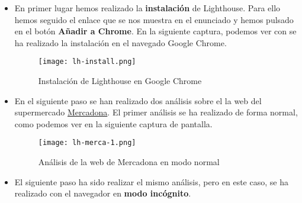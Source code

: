 \begin{itemize}
    \item En primer lugar hemos realizado la \textbf{instalación} de Lighthouse. Para ello hemos seguido el enlace que se nos muestra en el enunciado y hemos pulsado en el botón \textbf{Añadir a Chrome}. En la siguiente captura, podemos ver con se ha realizado la instalación en el navegado Google Chrome.

    \begin{figure}[H]
        \centering
        \texttt{[image: lh-install.png]}
        \caption{Instalación de Lighthouse en Google Chrome}
    \end{figure}

    \item En el siguiente paso se han realizado dos análisis sobre el la web del supermercado \href{https://www.mercadona.es/}{Mercadona}. El primer análisis se ha realizado de forma normal, como podemos ver en la siguiente captura de pantalla.

    \begin{figure}[H]
        \centering
        \texttt{[image: lh-merca-1.png]}
        \caption{Análisis de la web de Mercadona en modo normal}
    \end{figure}

    \item El siguiente paso ha sido realizar el mismo análisis, pero en este caso, se ha realizado con el navegador en \textbf{modo incógnito}.
\end{itemize}

%
%

